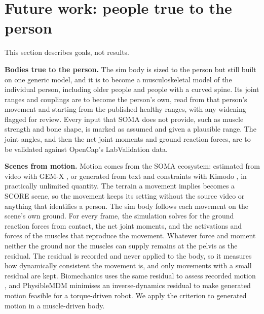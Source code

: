 \section{Future work: people true to the person}\label{future-work-people-true-to-the-person}

This section describes goals, not results.

\textbf{Bodies true to the person.} The sim body is sized to the person but still built on one generic model, and it is to become a musculoskeletal model of the individual person, including older people and people with a curved spine. Its joint ranges and couplings are to become the person's own, read from that person's movement and starting from the published healthy ranges, with any widening flagged for review. Every input that SOMA does not provide, such as muscle strength and bone shape, is marked as assumed and given a plausible range. The joint angles, and then the net joint moments and ground reaction forces, are to be validated against OpenCap's LabValidation data.

\textbf{Scenes from motion.} Motion comes from the SOMA ecosystem: estimated from video with GEM-X \citep{gemx}, or generated from text and constraints with Kimodo \citep{rempe2026kimodo}, in practically unlimited quantity. The terrain a movement implies becomes a SCORE scene, so the movement keeps its setting without the source video or anything that identifies a person. The sim body follows each movement on the scene's own ground. For every frame, the simulation solves for the ground reaction forces from contact, the net joint moments, and the activations and forces of the muscles that reproduce the movement. Whatever force and moment neither the ground nor the muscles can supply remains at the pelvis as the residual. The residual is recorded and never applied to the body, so it measures how dynamically consistent the movement is, and only movements with a small residual are kept. Biomechanics uses the same residual to assess recorded motion \citep{delp2007opensim, werling2023addbiomechanics}, and PhysibleMDM \citep{stolzle2026physiblemdm} minimises an inverse-dynamics residual to make generated motion feasible for a torque-driven robot. We apply the criterion to generated motion in a muscle-driven body.


